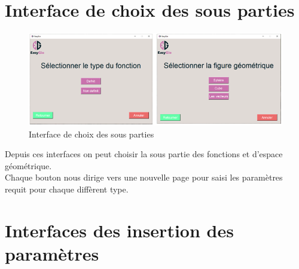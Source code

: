 \documentclass[a4paper]{report}
\begin{document}
\section{Interface de choix des sous parties}
\begin{figure}[!h]
    \centering
    \includegraphics[width=15cm]{images/TypesCaptures.PNG}
    \caption{Interface de choix des sous parties}
    \label{fig:Interface de choix des sous parties}
\end{figure}
Depuis ces interfaces on peut choisir la sous partie des fonctions et d'espace géométrique.\\
Chaque bouton nous dirige vers une nouvelle page pour saisi les paramètres requit pour chaque diffèrent type.
\newpage
\section{Interfaces des insertion des paramètres}
\end{document}
